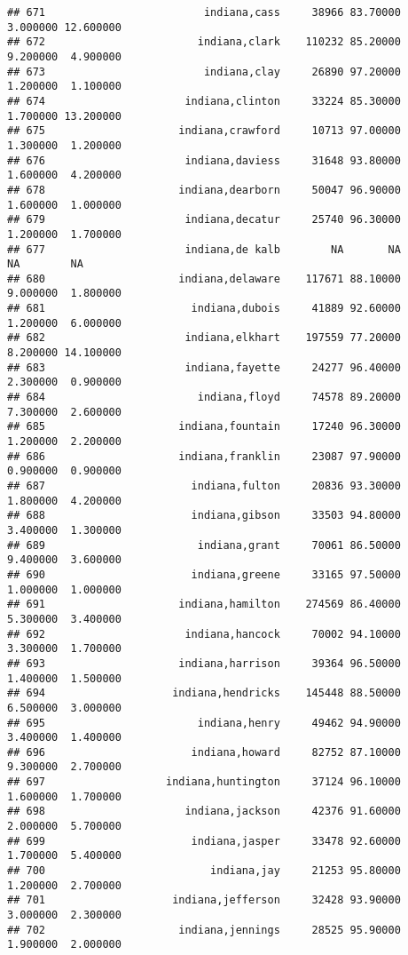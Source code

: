 \documentclass[
]{article}
\begin{document}
\begin{verbatim}
## 671                         indiana,cass     38966 83.70000  3.000000 12.600000
## 672                        indiana,clark    110232 85.20000  9.200000  4.900000
## 673                         indiana,clay     26890 97.20000  1.200000  1.100000
## 674                      indiana,clinton     33224 85.30000  1.700000 13.200000
## 675                     indiana,crawford     10713 97.00000  1.300000  1.200000
## 676                      indiana,daviess     31648 93.80000  1.600000  4.200000
## 678                     indiana,dearborn     50047 96.90000  1.600000  1.000000
## 679                      indiana,decatur     25740 96.30000  1.200000  1.700000
## 677                      indiana,de kalb        NA       NA        NA        NA
## 680                     indiana,delaware    117671 88.10000  9.000000  1.800000
## 681                       indiana,dubois     41889 92.60000  1.200000  6.000000
## 682                      indiana,elkhart    197559 77.20000  8.200000 14.100000
## 683                      indiana,fayette     24277 96.40000  2.300000  0.900000
## 684                        indiana,floyd     74578 89.20000  7.300000  2.600000
## 685                     indiana,fountain     17240 96.30000  1.200000  2.200000
## 686                     indiana,franklin     23087 97.90000  0.900000  0.900000
## 687                       indiana,fulton     20836 93.30000  1.800000  4.200000
## 688                       indiana,gibson     33503 94.80000  3.400000  1.300000
## 689                        indiana,grant     70061 86.50000  9.400000  3.600000
## 690                       indiana,greene     33165 97.50000  1.000000  1.000000
## 691                     indiana,hamilton    274569 86.40000  5.300000  3.400000
## 692                      indiana,hancock     70002 94.10000  3.300000  1.700000
## 693                     indiana,harrison     39364 96.50000  1.400000  1.500000
## 694                    indiana,hendricks    145448 88.50000  6.500000  3.000000
## 695                        indiana,henry     49462 94.90000  3.400000  1.400000
## 696                       indiana,howard     82752 87.10000  9.300000  2.700000
## 697                   indiana,huntington     37124 96.10000  1.600000  1.700000
## 698                      indiana,jackson     42376 91.60000  2.000000  5.700000
## 699                       indiana,jasper     33478 92.60000  1.700000  5.400000
## 700                          indiana,jay     21253 95.80000  1.200000  2.700000
## 701                    indiana,jefferson     32428 93.90000  3.000000  2.300000
## 702                     indiana,jennings     28525 95.90000  1.900000  2.000000

\end{verbatim}
\end{document}
